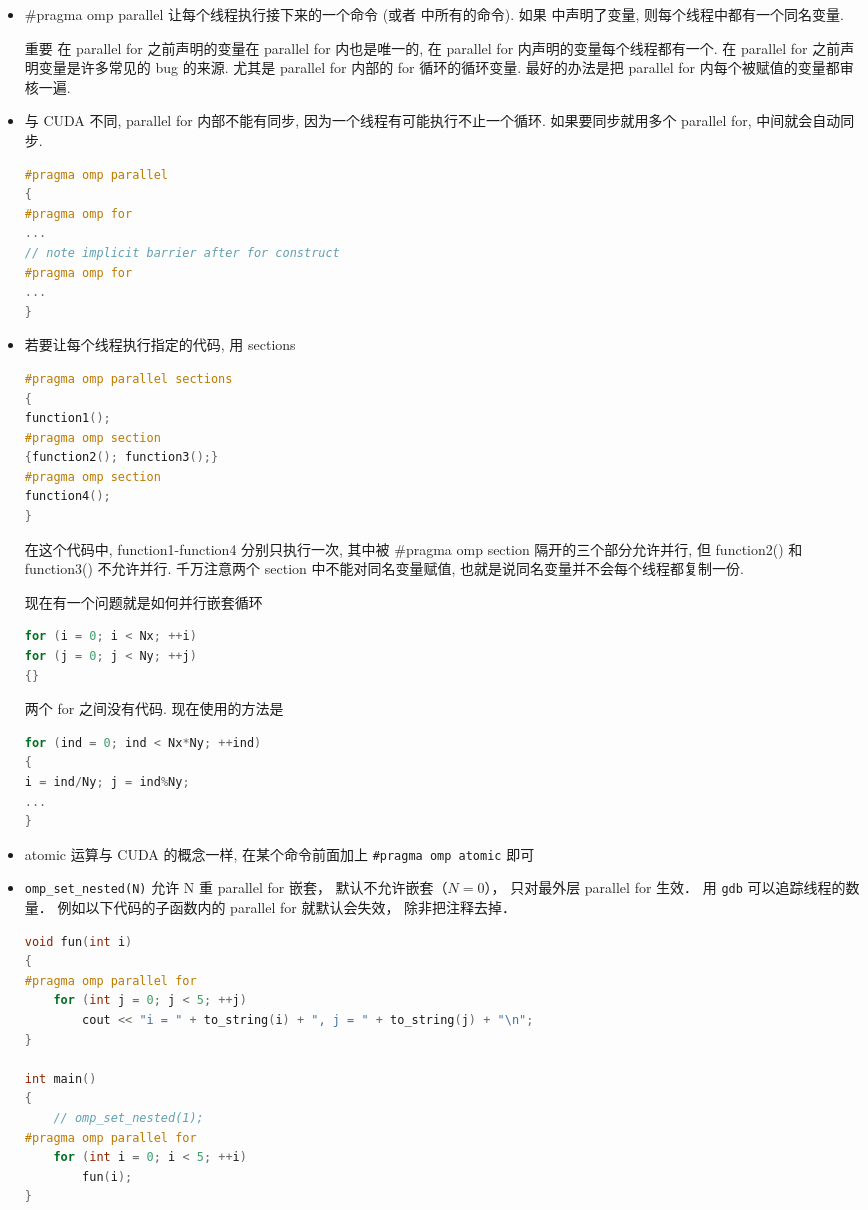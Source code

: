 \begin{itemize}
\item #pragma omp parallel 让每个线程执行接下来的一个命令 (或者 {} 中所有的命令). 如果 {} 中声明了变量, 则每个线程中都有一个同名变量.
\item [重要] 在 parallel for 之前声明的变量在 parallel for 内也是唯一的, 在 parallel for 内声明的变量每个线程都有一个. 在 parallel for 之前声明变量是许多常见的 bug 的来源. 尤其是 parallel for 内部的 for 循环的循环变量. 最好的办法是把 parallel for 内每个被赋值的变量都审核一遍.
\item 与 CUDA 不同, parallel for 内部不能有同步, 因为一个线程有可能执行不止一个循环. 如果要同步就用多个 parallel for, 中间就会自动同步.
\begin{lstlisting}[language=cpp]
#pragma omp parallel
{
#pragma omp for
...
// note implicit barrier after for construct
#pragma omp for
...
}
\end{lstlisting}
\item 若要让每个线程执行指定的代码, 用 sections
\begin{lstlisting}[language=cpp]
#pragma omp parallel sections
{
function1();
#pragma omp section
{function2(); function3();}
#pragma omp section
function4();
}
\end{lstlisting}
在这个代码中, function1-function4 分别只执行一次, 其中被 #pragma omp section 隔开的三个部分允许并行, 但 function2() 和 function3() 不允许并行. 千万注意两个 section 中不能对同名变量赋值, 也就是说同名变量并不会每个线程都复制一份.

现在有一个问题就是如何并行嵌套循环
\begin{lstlisting}[language=cpp]
for (i = 0; i < Nx; ++i)
for (j = 0; j < Ny; ++j)
{}
\end{lstlisting}
两个 for 之间没有代码. 现在使用的方法是
\begin{lstlisting}[language=cpp]
for (ind = 0; ind < Nx*Ny; ++ind)
{
i = ind/Ny; j = ind%Ny;
...
}
\end{lstlisting}
\item atomic 运算与 CUDA 的概念一样, 在某个命令前面加上 \verb|#pragma omp atomic| 即可
\item \verb|omp_set_nested(N)| 允许 N 重 parallel for 嵌套， 默认不允许嵌套（$N=0$）， 只对最外层 parallel for 生效． 用 \verb|gdb| 可以追踪线程的数量． 例如以下代码的子函数内的 parallel for 就默认会失效， 除非把注释去掉．
\begin{lstlisting}[language=cpp]
void fun(int i)
{
#pragma omp parallel for
	for (int j = 0; j < 5; ++j)
		cout << "i = " + to_string(i) + ", j = " + to_string(j) + "\n";
}

int main()
{
	// omp_set_nested(1);
#pragma omp parallel for
	for (int i = 0; i < 5; ++i)
		fun(i);
}
\end{lstlisting}
\end{itemize}
